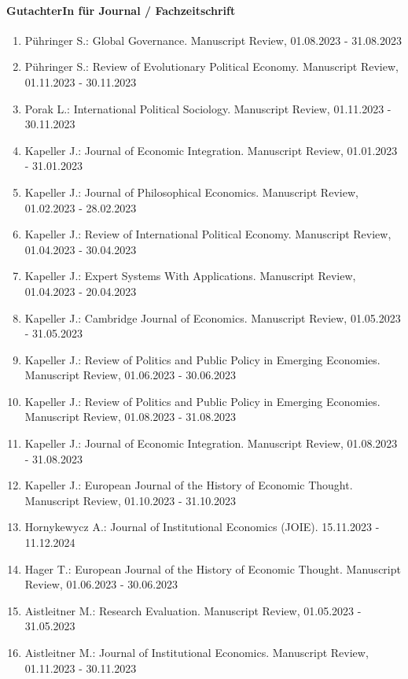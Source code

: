 \paragraph{GutachterIn für Journal / Fachzeitschrift}
\begin{enumerate}[leftmargin=*, labelsep=0.5cm]
\item Pühringer S.: Global Governance. Manuscript Review, 01.08.2023 - 31.08.2023
\item Pühringer S.: Review of Evolutionary Political Economy. Manuscript Review, 01.11.2023 - 30.11.2023
\item Porak L.: International Political Sociology. Manuscript Review, 01.11.2023 - 30.11.2023
\item Kapeller J.: Journal of Economic Integration. Manuscript Review, 01.01.2023 - 31.01.2023
\item Kapeller J.: Journal of Philosophical Economics. Manuscript Review, 01.02.2023 - 28.02.2023
\item Kapeller J.: Review of International Political Economy. Manuscript Review, 01.04.2023 - 30.04.2023
\item Kapeller J.: Expert Systems With Applications. Manuscript Review, 01.04.2023 - 20.04.2023
\item Kapeller J.: Cambridge Journal of Economics. Manuscript Review, 01.05.2023 - 31.05.2023
\item Kapeller J.: Review of Politics and Public Policy in Emerging Economies. Manuscript Review, 01.06.2023 - 30.06.2023
\item Kapeller J.: Review of Politics and Public Policy in Emerging Economies. Manuscript Review, 01.08.2023 - 31.08.2023
\item Kapeller J.: Journal of Economic Integration. Manuscript Review, 01.08.2023 - 31.08.2023
\item Kapeller J.: European Journal of the History of Economic Thought. Manuscript Review, 01.10.2023 - 31.10.2023
\item Hornykewycz A.: Journal of Institutional Economics (JOIE). 15.11.2023 - 11.12.2024
\item Hager T.: European Journal of the History of Economic Thought. Manuscript Review, 01.06.2023 - 30.06.2023
\item Aistleitner M.: Research Evaluation. Manuscript Review, 01.05.2023 - 31.05.2023
\item Aistleitner M.: Journal of Institutional Economics. Manuscript Review, 01.11.2023 - 30.11.2023
\end{enumerate}

